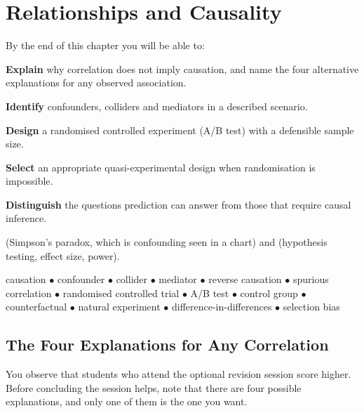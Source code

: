 \chapter{Relationships and Causality}\label{ch:causality}

\begin{outcomes}
By the end of this chapter you will be able to:
\begin{tight}
  \item \textbf{Explain} why correlation does not imply causation, and name the four alternative explanations for any observed association.
  \item \textbf{Identify} confounders, colliders and mediators in a described scenario.
  \item \textbf{Design} a randomised controlled experiment (A/B test) with a defensible sample size.
  \item \textbf{Select} an appropriate quasi-experimental design when randomisation is impossible.
  \item \textbf{Distinguish} the questions prediction can answer from those that require causal inference.
\end{tight}
\end{outcomes}

\begin{prereq}
 (Simpson's paradox, which is confounding seen in a chart) and
 (hypothesis testing, effect size, power).
\end{prereq}

\begin{keyterms}
causation $\bullet$ confounder $\bullet$ collider $\bullet$ mediator $\bullet$
reverse causation $\bullet$ spurious correlation $\bullet$ randomised controlled
trial $\bullet$ A/B test $\bullet$ control group $\bullet$ counterfactual $\bullet$
natural experiment $\bullet$ difference-in-differences $\bullet$ selection bias
\end{keyterms}

\section{The Four Explanations for Any Correlation}

You observe that students who attend the optional revision session score higher.
Before concluding the session helps, note that there are four possible
explanations, and only one of them is the one you want.

